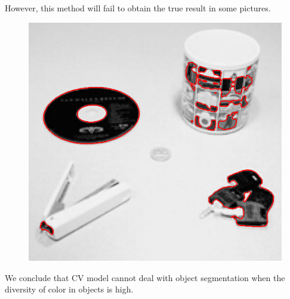 \documentclass{article}
\begin{document}
However, this method will fail to obtain the true result in some pictures.
\begin{figure}
\begin{center}
\includegraphics[scale=.5]{failure.png}
\end{center}
\end{figure}

We conclude that CV model cannot deal with object segmentation when the diversity of color in objects is high.
\end{document}

